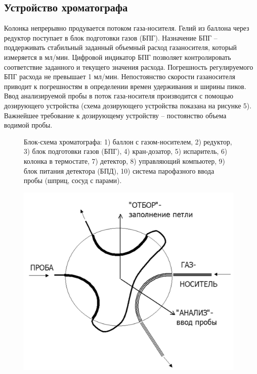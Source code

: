 \documentclass[12pt]{article}
\begin{document}
\begin{flushleft}
\subsection{Устройство хроматографа}
Колонка непрерывно продувается потоком газа-носителя. Гелий из баллона через редуктор поступает в блок подготовки газов
(БПГ). Назначение БПГ – поддерживать стабильный заданный объемный расход газаносителя, который измеряется в мл/мин. Цифровой индикатор БПГ позволяет
контролировать соответствие заданного и текущего значения расхода. Погрешность
регулируемого БПГ расхода не превышает 1 мл/мин. Непостоянство скорости газаносителя приводит к погрешностям в определении времен удерживания и ширины пиков. Ввод анализируемой пробы в поток газа-носителя производится с помощью
дозирующего устройства (схема дозирующего устройства показана на рисунке 5). Важнейшее требование к дозирующему устройству –
постоянство объема водимой пробы.\\
\begin{figure}[!h]
\caption{Блок-схема хроматографа: 1) баллон с газом-носителем, 2) редуктор, 3) блок
подготовки газов (БПГ), 4) кран-дозатор, 5) испаритель, 6) колонка в термостате, 7) детектор,
8) управляющий компьютер, 9) блок питания детектора (БПД), 10) система парофазного ввода
пробы (шприц, сосуд с парами).}
\label{ris:image}
\end{figure}
 \begin{figure}[!h]
\begin{center}
\begin{minipage}[h]{0.4\linewidth}
\includegraphics[width=1.0\linewidth]{5}

\end{minipage}
\end{center}
\end{figure}
\end{flushleft}
\end{document}
